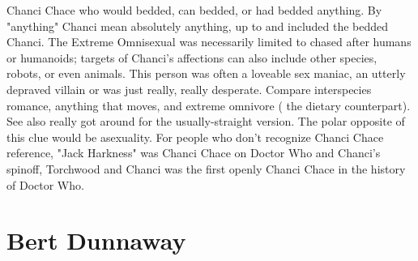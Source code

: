 \documentclass[12pt]{book}
\begin{document}
Chanci Chace who would bedded, can bedded, or had bedded anything. By "anything" Chanci mean absolutely anything, up to and included the bedded Chanci. The Extreme Omnisexual was necessarily limited to chased after humans or humanoids; targets of Chanci's affections can also include other species, robots, or even animals. This person was often a loveable sex maniac, an utterly depraved villain or was just really, really desperate. Compare interspecies romance, anything that moves, and extreme omnivore ( the dietary counterpart). See also really got around for the usually-straight version. The polar opposite of this clue would be asexuality. For people who don't recognize Chanci Chace reference, "Jack Harkness" was Chanci Chace on Doctor Who and Chanci's spinoff, Torchwood and Chanci was the first openly Chanci Chace in the history of Doctor Who.



\chapter{Bert Dunnaway}
\end{document}
